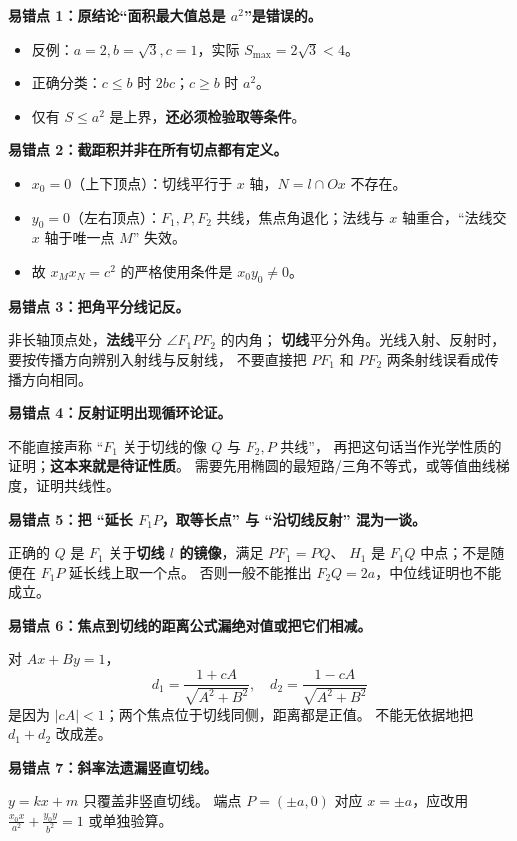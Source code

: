 \begin{trapbox}
\textbf{易错点 1：原结论“面积最大值总是 $a^2$”是错误的。}
\begin{itemize}
\item 反例：$a=2,b=\sqrt3,c=1$，实际 $S_{\max}=2\sqrt3<4$。
\item 正确分类：$c\le b$ 时 $2bc$；$c\ge b$ 时 $a^2$。
\item 仅有 $S\le a^2$ 是上界，\textbf{还必须检验取等条件}。
\end{itemize}

\textbf{易错点 2：截距积并非在所有切点都有定义。}
\begin{itemize}
\item $x_0=0$（上下顶点）：切线平行于 $x$ 轴，$N=l\cap Ox$ 不存在。
\item $y_0=0$（左右顶点）：$F_1,P,F_2$ 共线，焦点角退化；法线与 $x$ 轴重合，``法线交 $x$ 轴于唯一点 $M$'' 失效。
\item 故 $x_Mx_N=c^2$ 的严格使用条件是 $x_0y_0\ne0$。
\end{itemize}

\textbf{易错点 3：把角平分线记反。}

非长轴顶点处，\textbf{法线}平分 $\angle F_1PF_2$ 的内角；
\textbf{切线}平分外角。光线入射、反射时，要按传播方向辨别入射线与反射线，
不要直接把 $PF_1$ 和 $PF_2$ 两条射线误看成传播方向相同。

\textbf{易错点 4：反射证明出现循环论证。}

不能直接声称 ``$F_1$ 关于切线的像 $Q$ 与 $F_2,P$ 共线''，
再把这句话当作光学性质的证明；\textbf{这本来就是待证性质}。
需要先用椭圆的最短路/三角不等式，或等值曲线梯度，证明共线性。

\textbf{易错点 5：把 ``延长 $F_1P$，取等长点'' 与 ``沿切线反射'' 混为一谈。}

正确的 $Q$ 是 $F_1$ 关于\textbf{切线 $l$ 的镜像}，满足 $PF_1=PQ$、
$H_1$ 是 $F_1Q$ 中点；不是随便在 $F_1P$ 延长线上取一个点。
否则一般不能推出 $F_2Q=2a$，中位线证明也不能成立。

\textbf{易错点 6：焦点到切线的距离公式漏绝对值或把它们相减。}

对 $Ax+By=1$，
\[
d_1=\frac{1+cA}{\sqrt{A^2+B^2}},\quad
 d_2=\frac{1-cA}{\sqrt{A^2+B^2}}
\]
是因为 $|cA|<1$；两个焦点位于切线同侧，距离都是正值。
不能无依据地把 $d_1+d_2$ 改成差。

\textbf{易错点 7：斜率法遗漏竖直切线。}

$y=kx+m$ 只覆盖非竖直切线。
端点 $P=(\pm a,0)$ 对应 $x=\pm a$，应改用
$\frac{x_0x}{a^2}+\frac{y_0y}{b^2}=1$ 或单独验算。


\end{trapbox}
